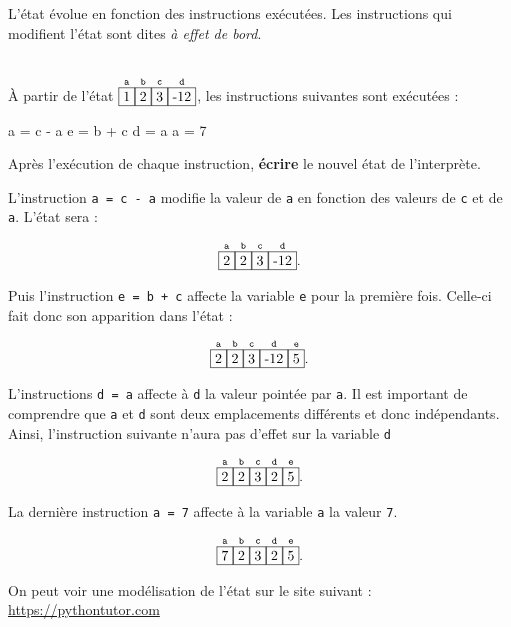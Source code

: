 \documentclass[a4paper,17pt]{extarticle}
\newenvironment{eleve}%
{\begin{activite}\color{noiramu}\\[-0.5cm]}
{\end{activite}}
\newenvironment{Shaded}{}{}
\newcommand{\DecValTok}[1]{\textcolor[rgb]{0.25,0.63,0.44}{{#1}}}
\newcommand{\NormalTok}[1]{{#1}}
\newcommand{\OperatorTok}[1]{\textcolor[rgb]{0.40,0.40,0.40}{{#1}}}
\begin{document}
    L'état évolue en fonction des instructions exécutées. Les instructions
qui modifient l'état sont dites \emph{à effet de bord}.
\begin{eleve}
    À partir de l'état
\(\overset{\texttt{a}}{\fbox{1}}\overset{\texttt{b}}{\fbox{2}}\overset{\texttt{c}}{\fbox{3}}\overset{\texttt{d}}{\fbox{-12}}\),
les instructions suivantes sont exécutées :

\begin{Shaded}
\begin{Highlighting}[]
\NormalTok{a }\OperatorTok{=}\NormalTok{ c }\OperatorTok{{-}}\NormalTok{ a}
\NormalTok{e }\OperatorTok{=}\NormalTok{ b }\OperatorTok{+}\NormalTok{ c}
\NormalTok{d }\OperatorTok{=}\NormalTok{ a}
\NormalTok{a }\OperatorTok{=} \DecValTok{7}
\end{Highlighting}
\end{Shaded}

Après l'exécution de chaque instruction, \textbf{écrire} le nouvel état
de l'interprète.
        
        \end{eleve}\begin{reponse}
    L'instruction \texttt{a\ =\ c\ -\ a} modifie la valeur de \texttt{a} en
fonction des valeurs de \texttt{c} et de \texttt{a}. L'état sera :

\[
\overset{\texttt{a}}{\fbox{2}}\overset{\texttt{b}}{\fbox{2}}\overset{\texttt{c}}{\fbox{3}}\overset{\texttt{d}}{\fbox{-12}}.
\]

Puis l'instruction \texttt{e\ =\ b\ +\ c} affecte la variable \texttt{e}
pour la première fois. Celle-ci fait donc son apparition dans l'état :

\[
\overset{\texttt{a}}{\fbox{2}}\overset{\texttt{b}}{\fbox{2}}\overset{\texttt{c}}{\fbox{3}}\overset{\texttt{d}}{\fbox{-12}}\overset{\texttt{e}}{\fbox{5}}.
\]

L'instructions \texttt{d\ =\ a} affecte à \texttt{d} la valeur pointée
par \texttt{a}. Il est important de comprendre que \texttt{a} et
\texttt{d} sont deux emplacements différents et donc indépendants.
Ainsi, l'instruction suivante n'aura pas d'effet sur la variable
\texttt{d}

\[
\overset{\texttt{a}}{\fbox{2}}\overset{\texttt{b}}{\fbox{2}}\overset{\texttt{c}}{\fbox{3}}\overset{\texttt{d}}{\fbox{2}}\overset{\texttt{e}}{\fbox{5}}.
\]

La dernière instruction \texttt{a\ =\ 7} affecte à la variable
\texttt{a} la valeur \texttt{7}.

\[
\overset{\texttt{a}}{\fbox{7}}\overset{\texttt{b}}{\fbox{2}}\overset{\texttt{c}}{\fbox{3}}\overset{\texttt{d}}{\fbox{2}}\overset{\texttt{e}}{\fbox{5}}.
\]

On peut voir une modélisation de l'état sur le site suivant :
\href{https://pythontutor.com/visualize.html\#code=a\%20\%3D\%201\%0Ab\%20\%3D\%202\%0Ac\%20\%3D\%203\%0Ad\%20\%3D\%20-12\%0A\%0Aa\%20\%3D\%20c\%20-\%20a\%0Ae\%20\%3D\%20b\%20\%2B\%20c\%0A\%0Ad\%20\%3D\%20a\%0Aa\%20\%3D\%207\&cumulative=true\&curInstr=0\&heapPrimitives=true\&mode=display\&origin=opt-frontend.js\&py=3\&rawInputLstJSON=\%5B\%5D\&textReferences=false}{https://pythontutor.com}

        \end{reponse}
\end{document}
